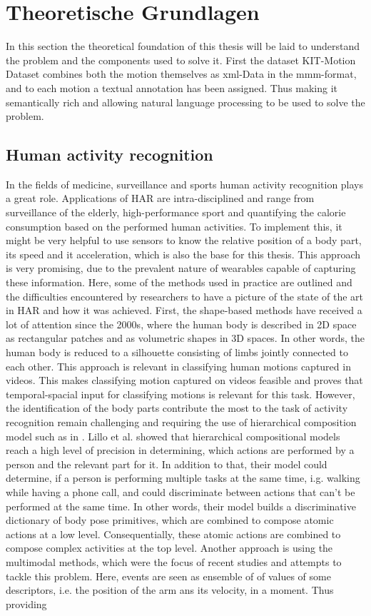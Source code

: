 \chapter{Theoretische Grundlagen}
In this section the theoretical foundation of this thesis will be laid to understand the problem and the components used to solve it. First the dataset KIT-Motion Dataset combines both the motion themselves as xml-Data in the mmm-format, and to each motion a textual annotation has been assigned. Thus making it semantically rich and allowing natural language processing to be used to solve the problem.
\section{Human activity recognition}\label{sec:HAR}
In the fields of medicine, surveillance and sports human activity recognition plays a great role. Applications of HAR are intra-disciplined and range from surveillance of the elderly, high-performance sport and quantifying the calorie consumption based on the performed human activities. To implement this, it might be very helpful to use sensors to know the relative position of a body part, its speed and it acceleration, which is also the base for this thesis. This approach is very promising, due to the prevalent nature of wearables capable of capturing these information. Here, some of the methods used in practice are outlined and the difficulties encountered by researchers to have a picture of the state of the art in HAR and how it was achieved. First, the shape-based methods have received a lot of attention since the 2000s, where the human body is described in 2D space as rectangular patches and as volumetric shapes in 3D spaces. In other words, the human body is reduced to a silhouette consisting of limbs jointly connected to each other. This approach is relevant in classifying human motions captured in videos\cite{vrigkas2015review}. This makes classifying motion captured on videos feasible and proves that temporal-spacial input for classifying motions is relevant for this task. However, the identification of the body parts contribute the most to the task of activity recognition remain challenging and requiring the use of hierarchical composition model such as in \cite{lillo2014discriminative}. Lillo et al. showed that hierarchical compositional models reach a high level of precision in determining, which actions are performed by a person and the relevant part for it. In addition to that, their model could determine, if a person is performing multiple tasks at the same time, i.g. walking while having a phone call, and could discriminate between actions that can't be performed at the same time. In other words, their model builds a discriminative dictionary of body pose primitives, which are combined to compose atomic actions at a low level. Consequentially, these atomic actions are combined to compose complex activities at the top level\cite{lillo2014discriminative}. Another approach is using the multimodal methods, which were the focus of recent studies and attempts to tackle this problem. Here, events are seen as ensemble of of values of some descriptors, i.e. the position of the arm ans its velocity, in a moment. Thus providing 